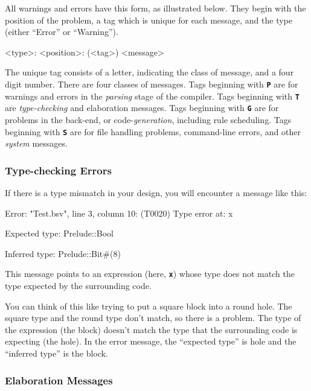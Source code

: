 \documentclass{article}
\newenvironment{centerboxverbatim}
  {\center
   \boxedverbatim}
  {\endboxedverbatim
  {\endcenter }}
\begin{document}
All warnings and errors have this form, as illustrated below.  They
begin with the position of the problem, a tag which is unique for each
message, and the type (either ``Error'' or ``Warning'').

\begin{centerboxverbatim}
<type>: <position>: (<tag>)
  <message>
\end{centerboxverbatim}


The unique tag consists of a letter, indicating the class of message,
and a four digit number.  There are four classes of messages.  Tags
beginning with {\bf\tt P} are for warnings and errors in the
\emph{parsing} stage of the compiler.  Tags beginning with {\bf\tt T}
are \emph{type-checking} and elaboration messages.  Tags beginning with
{\bf\tt G} are for problems in the back-end, or code-\emph{generation},
including rule scheduling.  Tags beginning with {\bf\tt S} are for
file handling problems, command-line errors, and other \emph{system}
messages.


\subsubsection{Type-checking Errors}

If there is a type mismatch in your design, you will encounter
a message like this:

\begin{centerboxverbatim}
Error: "Test.bsv", line 3, column 10: (T0020)
  Type error at:
  x

  Expected type:
  Prelude::Bool

  Inferred type:
  Prelude::Bit#(8)
\end{centerboxverbatim}

This message points to an expression (here, {\bf\tt x}) whose type
does not match the type expected by the surrounding code.

You can think of this like trying to put a square block into a round
hole.  The square type and the round type don't match, so there is a
problem.  The type of the expression (the block) doesn't match the
type that the surrounding code is expecting (the hole).  In the
error message, the ``expected type'' is hole and the ``inferred type''
is the block.


\subsubsection{Elaboration Messages}
\label{elab-msgs}
\end{document}
